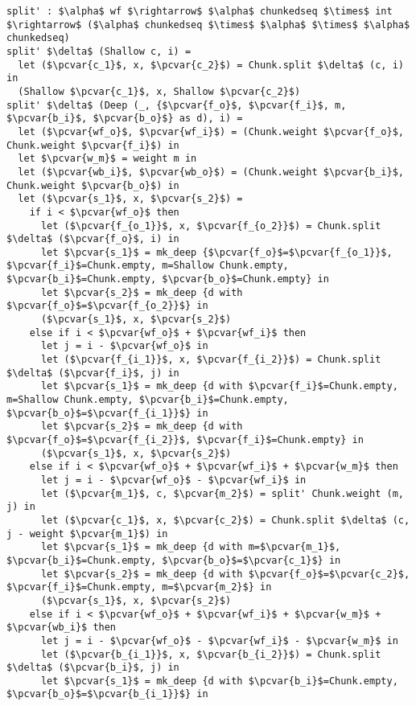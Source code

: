 \documentclass[10pt]{article}
\newcommand{\pcvar}[1]{\mathtt{#1}}
\begin{document}
\begin{lstlisting}[language=pcpp,style=nonumbers]
split' : $\alpha$ wf $\rightarrow$ $\alpha$ chunkedseq $\times$ int $\rightarrow$ ($\alpha$ chunkedseq $\times$ $\alpha$ $\times$ $\alpha$ chunkedseq)
split' $\delta$ (Shallow c, i) =
  let ($\pcvar{c_1}$, x, $\pcvar{c_2}$) = Chunk.split $\delta$ (c, i) in
  (Shallow $\pcvar{c_1}$, x, Shallow $\pcvar{c_2}$)
split' $\delta$ (Deep (_, {$\pcvar{f_o}$, $\pcvar{f_i}$, m, $\pcvar{b_i}$, $\pcvar{b_o}$} as d), i) =
  let ($\pcvar{wf_o}$, $\pcvar{wf_i}$) = (Chunk.weight $\pcvar{f_o}$, Chunk.weight $\pcvar{f_i}$) in
  let $\pcvar{w_m}$ = weight m in
  let ($\pcvar{wb_i}$, $\pcvar{wb_o}$) = (Chunk.weight $\pcvar{b_i}$, Chunk.weight $\pcvar{b_o}$) in
  let ($\pcvar{s_1}$, x, $\pcvar{s_2}$) = 
    if i < $\pcvar{wf_o}$ then
      let ($\pcvar{f_{o_1}}$, x, $\pcvar{f_{o_2}}$) = Chunk.split $\delta$ ($\pcvar{f_o}$, i) in
      let $\pcvar{s_1}$ = mk_deep {$\pcvar{f_o}$=$\pcvar{f_{o_1}}$, $\pcvar{f_i}$=Chunk.empty, m=Shallow Chunk.empty, $\pcvar{b_i}$=Chunk.empty, $\pcvar{b_o}$=Chunk.empty} in
      let $\pcvar{s_2}$ = mk_deep {d with $\pcvar{f_o}$=$\pcvar{f_{o_2}}$} in
      ($\pcvar{s_1}$, x, $\pcvar{s_2}$)
    else if i < $\pcvar{wf_o}$ + $\pcvar{wf_i}$ then
      let j = i - $\pcvar{wf_o}$ in
      let ($\pcvar{f_{i_1}}$, x, $\pcvar{f_{i_2}}$) = Chunk.split $\delta$ ($\pcvar{f_i}$, j) in
      let $\pcvar{s_1}$ = mk_deep {d with $\pcvar{f_i}$=Chunk.empty, m=Shallow Chunk.empty, $\pcvar{b_i}$=Chunk.empty, $\pcvar{b_o}$=$\pcvar{f_{i_1}}$} in
      let $\pcvar{s_2}$ = mk_deep {d with $\pcvar{f_o}$=$\pcvar{f_{i_2}}$, $\pcvar{f_i}$=Chunk.empty} in
      ($\pcvar{s_1}$, x, $\pcvar{s_2}$)
    else if i < $\pcvar{wf_o}$ + $\pcvar{wf_i}$ + $\pcvar{w_m}$ then
      let j = i - $\pcvar{wf_o}$ - $\pcvar{wf_i}$ in
      let ($\pcvar{m_1}$, c, $\pcvar{m_2}$) = split' Chunk.weight (m, j) in
      let ($\pcvar{c_1}$, x, $\pcvar{c_2}$) = Chunk.split $\delta$ (c, j - weight $\pcvar{m_1}$) in
      let $\pcvar{s_1}$ = mk_deep {d with m=$\pcvar{m_1}$, $\pcvar{b_i}$=Chunk.empty, $\pcvar{b_o}$=$\pcvar{c_1}$} in
      let $\pcvar{s_2}$ = mk_deep {d with $\pcvar{f_o}$=$\pcvar{c_2}$, $\pcvar{f_i}$=Chunk.empty, m=$\pcvar{m_2}$} in
      ($\pcvar{s_1}$, x, $\pcvar{s_2}$)
    else if i < $\pcvar{wf_o}$ + $\pcvar{wf_i}$ + $\pcvar{w_m}$ + $\pcvar{wb_i}$ then
      let j = i - $\pcvar{wf_o}$ - $\pcvar{wf_i}$ - $\pcvar{w_m}$ in
      let ($\pcvar{b_{i_1}}$, x, $\pcvar{b_{i_2}}$) = Chunk.split $\delta$ ($\pcvar{b_i}$, j) in
      let $\pcvar{s_1}$ = mk_deep {d with $\pcvar{b_i}$=Chunk.empty, $\pcvar{b_o}$=$\pcvar{b_{i_1}}$} in

\end{lstlisting}
\end{document}

